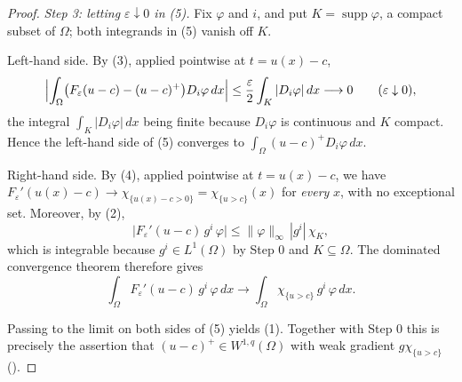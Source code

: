 \begin{proof}
\emph{Step 3: letting $\varepsilon\downarrow0$ in (5).}  Fix $\varphi$ and $i$,
and put $K=\operatorname{supp}\varphi$, a compact subset of $\Omega$; both
integrands in (5) vanish off $K$.

Left-hand side.  By (3), applied pointwise at $t=u(x)-c$,
\[
\Bigl|\int_\Omega\bigl(F_\varepsilon(u-c)-(u-c)^+\bigr)D_i\varphi\,dx\Bigr|
\le\frac{\varepsilon}2\int_K|D_i\varphi|\,dx\longrightarrow0
\qquad(\varepsilon\downarrow0),
\]
the integral $\int_K|D_i\varphi|\,dx$ being finite because $D_i\varphi$ is
continuous and $K$ compact.  Hence the left-hand side of (5) converges to
$\int_\Omega(u-c)^+D_i\varphi\,dx$.

Right-hand side.  By (4), applied pointwise at $t=u(x)-c$, we have
$F_\varepsilon'(u(x)-c)\to\chi_{\{u(x)-c>0\}}=\chi_{\{u>c\}}(x)$ for
\emph{every} $x$, with no exceptional set.  Moreover, by (2),
\[
\bigl|F_\varepsilon'(u-c)\,g^i\,\varphi\bigr|\le\|\varphi\|_\infty\,|g^i|\,\chi_K ,
\]
which is integrable because $g^i\in L^1(\Omega)$ by Step 0 and $K\subseteq\Omega$.
The dominated convergence theorem therefore gives
\[
\int_\Omega F_\varepsilon'(u-c)\,g^i\,\varphi\,dx
\longrightarrow\int_\Omega\chi_{\{u>c\}}\,g^i\,\varphi\,dx .
\]

Passing to the limit on both sides of (5) yields (1).  Together with Step 0 this
is precisely the assertion that $(u-c)^+\in W^{1,q}(\Omega)$ with weak gradient
$g\chi_{\{u>c\}}$ ().
\end{proof}
